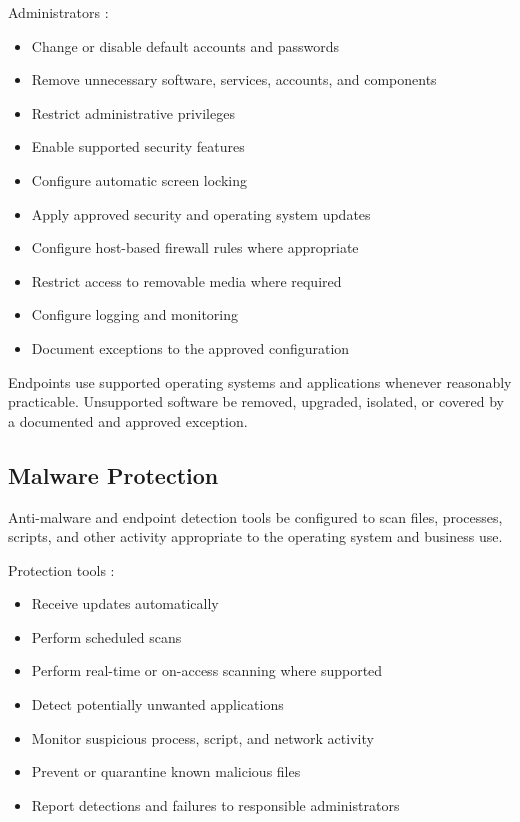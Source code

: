 Administrators \must{}:
\begin{itemize}
    \item Change or disable default accounts and passwords
    \item Remove unnecessary software, services, accounts, and components
    \item Restrict administrative privileges
    \item Enable supported security features
    \item Configure automatic screen locking
    \item Apply approved security and operating system updates
    \item Configure host-based firewall rules where appropriate
    \item Restrict access to removable media where required
    \item Configure logging and monitoring
    \item Document exceptions to the approved configuration
\end{itemize}

Endpoints \must{} use supported operating systems and applications whenever reasonably practicable. Unsupported software \must{} be removed, upgraded, isolated, or covered by a documented and approved exception.

\subsection{Malware Protection}

Anti-malware and endpoint detection tools \must{} be configured to scan files, processes, scripts, and other activity appropriate to the operating system and business use.

Protection tools \should{}:
\begin{itemize}
    \item Receive updates automatically
    \item Perform scheduled scans
    \item Perform real-time or on-access scanning where supported
    \item Detect potentially unwanted applications
    \item Monitor suspicious process, script, and network activity
    \item Prevent or quarantine known malicious files
    \item Report detections and failures to responsible administrators
\end{itemize}

